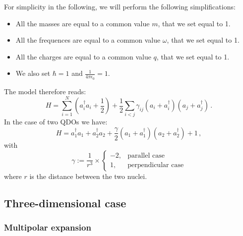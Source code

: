 \documentclass[reprint, amsmath, amssymb, aps]{revtex4-2}
\begin{document}
        For simplicity in the following, we will perform the following simplifications:
        \begin{itemize}
            \item All the masses are equal to a common value $m$, that we set equal to 1.
            \item All the frequences are equal to a common value $\omega$, that we set equal to 1.
            \item All the charges are equal to a common value $q$, that we set equal to 1.
            \item We also set $\hbar=1$ and $\tfrac{1}{4\pi\epsilon_0}=1$.
        \end{itemize}
        The model therefore reads:
        \begin{equation}
        \label{eq:hamiltonian_N_qdos}
            H = \sum_{i=1}^N\left(a_i^\dagger a_i+\frac{1}{2}\right) + \frac{1}{2}\sum_{i<j}\gamma_{ij}\left(a_i+a_i^\dagger\right)\left(a_j+a_j^\dagger\right)\,.
        \end{equation}
        In the case of two QDOs we have:
        \begin{equation}
            H = a_1^\dagger a_1 + a_2^\dagger a_2 + \frac{\gamma}{2}\left(a_1+a_1^\dagger\right)\left(a_2+a_2^\dagger\right) + 1\,,
        \end{equation}
        with
        \begin{equation}
            \gamma := \frac{1}{r^3}\times
            \begin{cases}
                -2, & \text{parallel case} \\
                1, & \text{perpendicular case}
            \end{cases}
        \end{equation}
        where $r$ is the distance between the two nuclei.



    \subsection{Three-dimensional case}

        \subsubsection{Multipolar expansion}
\end{document}
